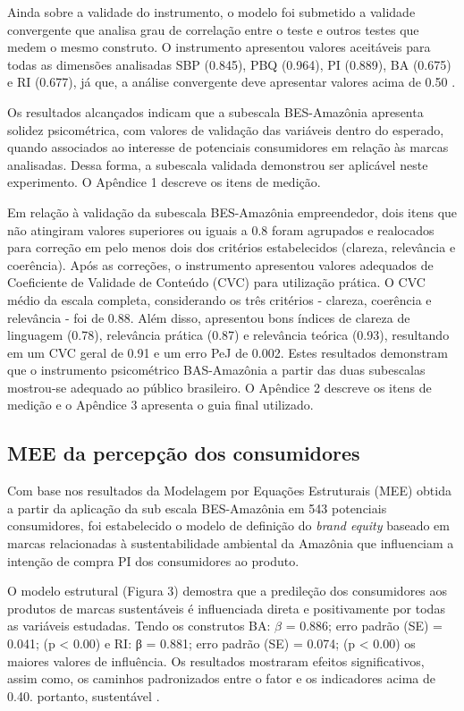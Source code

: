 Ainda sobre a validade do instrumento, o modelo foi submetido a validade convergente que analisa grau de correlação entre o teste e outros testes que medem o mesmo construto. O instrumento apresentou valores aceitáveis para todas as dimensões analisadas SBP (0.845), PBQ (0.964), PI (0.889), BA (0.675) e RI (0.677), já que, a análise convergente deve apresentar valores acima de 0.50 \cite{Maroco2014}.

Os resultados alcançados indicam que a subescala BES-Amazônia apresenta solidez psicométrica, com valores de validação das variáveis dentro do esperado, quando associados ao interesse de potenciais consumidores em relação às marcas analisadas. Dessa forma, a subescala validada demonstrou ser aplicável neste experimento. O Apêndice 1 descreve os itens de medição.

Em relação à validação da subescala BES-Amazônia empreendedor, dois itens que não atingiram valores superiores ou iguais a 0.8 foram agrupados e realocados para correção em pelo menos dois dos critérios estabelecidos (clareza, relevância e coerência). Após as correções, o instrumento apresentou valores adequados de Coeficiente de Validade de Conteúdo (CVC) para utilização prática. O CVC médio da escala completa, considerando os três critérios - clareza, coerência e relevância - foi de 0.88. Além disso, apresentou bons índices de clareza de linguagem (0.78), relevância prática (0.87) e relevância teórica (0.93), resultando em um CVC geral de 0.91 e um erro PeJ de 0.002. Estes resultados demonstram que o instrumento psicométrico BAS-Amazônia a partir das duas subescalas mostrou-se adequado ao público brasileiro. O Apêndice 2 descreve os itens de medição e o Apêndice 3 apresenta o guia final utilizado.

\subsection{MEE da percepção dos consumidores}

Com base nos resultados da Modelagem por Equações Estruturais (MEE) obtida a partir da aplicação da sub escala BES-Amazônia em 543 potenciais consumidores, foi estabelecido o modelo de definição do \textit{brand equity} baseado em marcas relacionadas à sustentabilidade ambiental da Amazônia que influenciam a intenção de compra PI dos consumidores ao produto. 

O modelo estrutural (Figura 3) demostra que a predileção dos consumidores aos produtos de marcas sustentáveis é influenciada direta e positivamente por todas as variáveis estudadas. Tendo os construtos BA: $\beta$ = 0.886; erro padrão (SE) = 0.041; (p < 0.00) e RI: β = 0.881; erro padrão (SE) = 0.074; (p < 0.00) os maiores valores de influência. Os resultados mostraram efeitos significativos, assim como, os caminhos padronizados entre o fator e os indicadores acima de 0.40. portanto, sustentável \cite{Wang2019StructuralModels}.


